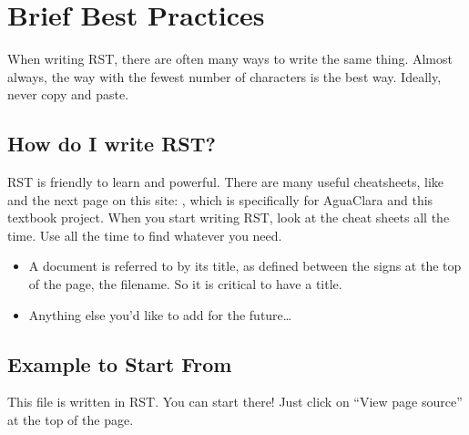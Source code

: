 \documentclass[letterpaper,10pt,english]{sphinxmanual}
\begin{document}
\section{Brief Best Practices}
\label{\detokenize{Textbook_Creation_Help/rst_intro:brief-best-practices}}\label{\detokenize{Textbook_Creation_Help/rst_intro:heading-brief-best-practices}}
When writing RST, there are often many ways to write the same thing. Almost always, the way with the fewest number of characters is the best way. Ideally, never copy and paste.


\subsection{How do I write RST?}
\label{\detokenize{Textbook_Creation_Help/rst_intro:how-do-i-write-rst}}\label{\detokenize{Textbook_Creation_Help/rst_intro:heading-how-do-i-write-rst}}
RST is friendly to learn and powerful. There are many useful cheatsheets, like  and the next page on this site: , which is specifically for AguaClara and this textbook project. When you start writing RST, look at the cheat sheets all the time. Use  all the time to find whatever you need.

\begin{itemize}
\item {} 
A document is referred to by its title, as defined between the \sphinxcode{\sphinxupquote{*****}} signs at the top of the page,  the filename. So it is critical to have a title.

\item {} 
Anything else you’d like to add for the future…

\end{itemize}


\subsection{Example to Start From}
\label{\detokenize{Textbook_Creation_Help/rst_intro:example-to-start-from}}\label{\detokenize{Textbook_Creation_Help/rst_intro:heading-example-to-start-from}}
This file is written in RST. You can start there! Just click on “View page source” at the top of the page.
\end{document}
